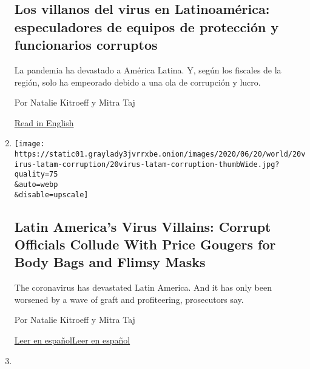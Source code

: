 \begin{enumerate}
  \hypertarget{los-villanos-del-virus-en-latinoamuxe9rica-especuladores-de-equipos-de-protecciuxf3n-y-funcionarios-corruptos}{%
  \subsection{Los villanos del virus en Latinoamérica: especuladores de
  equipos de protección y funcionarios
  corruptos}\label{los-villanos-del-virus-en-latinoamuxe9rica-especuladores-de-equipos-de-protecciuxf3n-y-funcionarios-corruptos}}

  La pandemia ha devastado a América Latina. Y, según los fiscales de la
  región, solo ha empeorado debido a una ola de corrupción y lucro.

  Por Natalie Kitroeff y Mitra Taj

  \href{https://www.nytimes3xbfgragh.onion/2020/06/20/world/americas/coronavirus-latin-america-corruption.html}{Read
  in English}
\item
  \href{/2020/06/20/world/americas/coronavirus-latin-america-corruption.html}{}

  \texttt{[image: https://static01.graylady3jvrrxbe.onion/images/2020/06/20/world/20virus-latam-corruption/20virus-latam-corruption-thumbWide.jpg?quality=75\\\&auto=webp\\\&disable=upscale]}

  \hypertarget{latin-americas-virus-villains-corrupt-officials-collude-with-price-gougers-for-body-bags-and-flimsy-masks}{%
  \subsection{Latin America's Virus Villains: Corrupt Officials Collude
  With Price Gougers for Body Bags and Flimsy
  Masks}\label{latin-americas-virus-villains-corrupt-officials-collude-with-price-gougers-for-body-bags-and-flimsy-masks}}

  The coronavirus has devastated Latin America. And it has only been
  worsened by a wave of graft and profiteering, prosecutors say.

  Por Natalie Kitroeff y Mitra Taj

  \href{https://www.nytimes3xbfgragh.onion/es/2020/06/20/espanol/america-latina/corrupcion-coronavirus-latinoamerica.html}{Leer
  en
  español}\href{https://www.nytimes3xbfgragh.onion/es/2020/06/20/espanol/america-latina/corrupcion-coronavirus-latinoamerica.html}{Leer
  en español}
\item
  \href{/es/2020/06/19/espanol/america-latina/piratas-golfo-mexico-campeche.html}{}


\end{enumerate}
